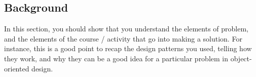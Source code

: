 \subsection{Background}

\label{sec:background}

In this section, you should show that you understand the elements of problem,
and the elements of the course / activity that go into making a solution. For
instance, this is a good point to recap the design patterns you used, telling
how they work, and why they can be a good idea for a particular problem in
object-oriented design.
